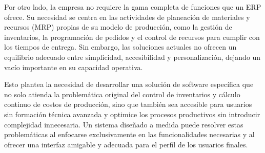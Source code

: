Por otro lado, la empresa no requiere la gama completa de funciones que un ERP ofrece. Su necesidad se centra en las actividades de planeación de materiales y recursos (MRP) propias de su modelo de producción, como la gestión de inventarios, la programación de pedidos y el control de recursos para cumplir con los tiempos de entrega. Sin embargo, las soluciones actuales no ofrecen un equilibrio adecuado entre simplicidad, accesibilidad y personalización, dejando un vacío importante en su capacidad operativa.

Esto plantea la necesidad de desarrollar una solución de software específica que no solo atienda la problemática original del control de inventarios y cálculo continuo de costos de producción, sino que también sea accesible para usuarios sin formación técnica avanzada y optimice los procesos productivos sin introducir complejidad innecesaria. Un sistema diseñado a medida puede resolver estas problemáticas al enfocarse exclusivamente en las funcionalidades necesarias y al ofrecer una interfaz amigable y adecuada para el perfil de los usuarios finales.
